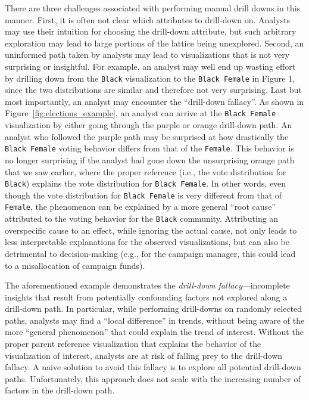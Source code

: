 \par There are three challenges associated with performing manual drill downs in this manner. First, it is often not clear which attributes to drill-down on. Analysts may use their intuition for choosing the drill-down attribute, but such arbitrary exploration may lead to large portions of the lattice being unexplored. Second, an uninformed path taken by analysts may lead to visualizations that is not very surprising or insightful. For example, an analyst may well end up wasting effort by drilling down from the \texttt{Black} visualization to the \texttt{Black Female} in Figure 1, since the two distributions are similar and therefore not very surprising. Last but most importantly, an analyst may encounter the ``drill-down fallacy''. As shown in Figure~\ref{fig:elections_example}, an analyst can arrive at the \texttt{Black Female} visualization by either going through the purple or orange drill-down path. An analyst who followed the purple path may be surprised at how drastically the \texttt{Black Female} voting behavior differs from that of the \texttt{Female}. This behavior is no longer surprising if the analyst had gone down the unsurprising orange path that we saw earlier, where the proper reference (i.e., the vote distribution for \texttt{Black}) explains the vote distribution for \texttt{Black Female}. In other words, even though the vote distribution for \texttt{Black Female} is very different from that of \texttt{Female}, the phenomenon can be explained by a more general ``root cause'' attributed to the voting behavior for the \texttt{Black} community. Attributing an overspecific cause to an effect, while ignoring the actual cause, not only leads to less interpretable explanations for the observed visualizations, but can also be detrimental to decision-making (e.g., for the campaign manager, this could lead to a misallocation of campaign funds).
\par The aforementioned example demonstrates the \emph{drill-down fallacy}---incomplete insights that result from potentially confounding factors not explored along a drill-down path. In particular, while performing drill-downs on randomly selected paths, analysts may find a ``local difference'' in trends, without being aware of the more ``general phenomenon'' that could explain the trend of interest. Without the proper parent reference visualization that explains the behavior of the visualization of interest, analysts are at risk of falling prey to the drill-down fallacy. A naive solution to avoid this fallacy is to explore all potential drill-down paths. Unfortunately, this approach does not scale with the increasing number of factors in the drill-down path.
